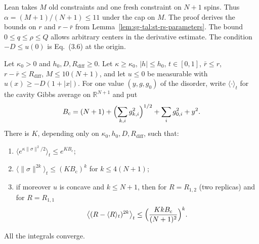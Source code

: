 \begin{remark}\label{rem:sg-tal:st-prop-3210}
Lean takes $M$ old constraints and one fresh constraint on $N+1$ spins. Thus
$\alpha=(M+1)/(N+1)\le 11$ under the cap on $M$. The proof derives the bounds on $r$
and $r-\bar r$ from Lemma~\ref{lem:sg-tal:st-rs-parameters}. The bound
$0\le q\le\rho\le Q$ allows arbitrary centers in the derivative estimate.
The condition $-D\le u(0)$ is Eq.~(3.6) at the origin.
\end{remark}

\begin{lemma}\label{lem:sg-tal:st-cavity-quenched}
  \leanok
Let $\kappa_0>0$ and $h_0,D,R_{\mathrm{diff}}\ge0$. Let $\kappa\ge\kappa_0$, $|h|\le h_0$, $t\in[0,1]$,
$\bar r\le r$, $r-\bar r\le R_{\mathrm{diff}}$, $M\le10(N+1)$, and let $u\le0$ be measurable with
$u(x)\ge-D(1+|x|)$. For one value $(y,g,g_0)$ of the disorder, write $\langle\cdot\rangle_t$ for the cavity
Gibbs average on $\mathbb R^{N+1}$ and put
\[
B_{\mathrm c}=(N+1)+\Bigl(\sum_{k,i}g_{k,i}^2\Bigr)^{1/2}+\sum_ig_{0,i}^2+y^2 .
\]
There is $K$, depending only on $\kappa_0,h_0,D,R_{\mathrm{diff}}$, such that:
\begin{enumerate}
\item $\langle e^{\kappa\|\sigma\|^2/2}\rangle_t\le e^{KB_{\mathrm c}}$;
\item $\langle\|\sigma\|^{2k}\rangle_t\le(KB_{\mathrm c})^k$ for $k\le4(N+1)$;
\item if moreover $u$ is concave and $k\le N+1$, then for $R=R_{1,2}$ (two replicas) and for $R=R_{1,1}$
\[
\bigl\langle(R-\langle R\rangle_t)^{2k}\bigr\rangle_t\le\Bigl(\frac{KkB_{\mathrm c}}{(N+1)^2}\Bigr)^k .
\]
\end{enumerate}
All the integrals converge.
\end{lemma}
